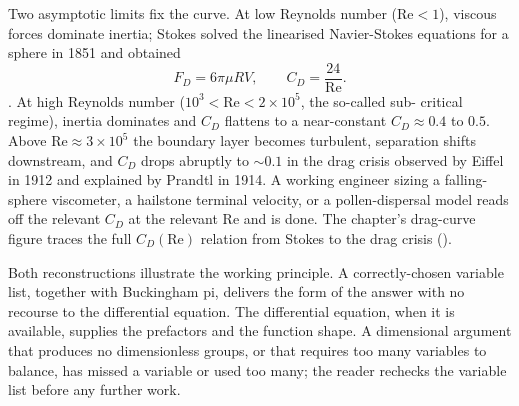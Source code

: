 Two asymptotic limits fix the curve. At low Reynolds number
($\mathrm{Re} < 1$), viscous forces dominate inertia; Stokes
solved the linearised Navier-Stokes equations for a sphere in
1851 and obtained
\[
F_{D} = 6\pi \mu R V, \qquad C_{D} = \frac{24}{\mathrm{Re}}.
\]
\cite{paper:ch02t3b-stokes-1851}. At high Reynolds number
($10^{3} < \mathrm{Re} < 2 \times 10^{5}$, the so-called sub-
critical regime), inertia dominates and $C_{D}$ flattens to a
near-constant $C_{D} \approx 0.4$ to $0.5$. Above $\mathrm{Re}
\approx 3 \times 10^{5}$ the boundary layer becomes turbulent,
separation shifts downstream, and $C_{D}$ drops abruptly to
$\sim 0.1$ in the drag crisis observed by Eiffel in 1912 and
explained by Prandtl in 1914. A working engineer sizing a
falling-sphere viscometer, a hailstone terminal velocity, or a
pollen-dispersal model reads off the relevant $C_{D}$ at the
relevant $\mathrm{Re}$ and is done. The chapter's drag-curve figure
traces the full $C_{D}(\mathrm{Re})$ relation from Stokes to the
drag crisis ().

Both reconstructions illustrate the working principle. A
correctly-chosen variable list, together with Buckingham pi,
delivers the form of the answer with no recourse to the
differential equation. The differential equation, when it is
available, supplies the prefactors and the function shape.
A dimensional argument that produces no dimensionless groups,
or that requires too many variables to balance, has missed a
variable or used too many; the reader rechecks the variable
list before any further work.

